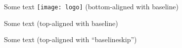 \documentclass{article}
\begin{document}
Some text \texttt{[image: logo]} (bottom-aligned with baseline)

\medskip

Some text  (top-aligned with baseline)

\medskip

Some text  (top-aligned with ``baselineskip'')
\end{document}
